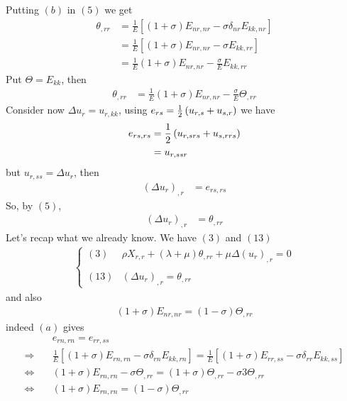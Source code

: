 Putting $(b)$ in $(5)$ we get
\begin{align}
\theta_{,rr}&= \frac{1}{E}\left[\left(1+\sigma\right)E_{nr,nr}-\sigma\delta_{nr}E_{kk,nr}\right]\\
&= \frac{1}{E}\left[\left(1+\sigma\right)E_{nr,nr}-\sigma E_{kk,rr}\right]\\
&= \frac{1}{E}\left(1+\sigma\right)E_{nr,nr}- \frac{\sigma}{E} E_{kk,rr}
\end{align}
Put $\Theta=E_{kk}$, then 
\begin{align}
\theta_{,rr}&= \frac{1}{E}\left(1+\sigma\right)E_{nr,nr}- \frac{\sigma}{E} \Theta_{,rr}
\end{align}
Consider now $\Delta u_r = u_{r,kk}$, using $e_{rs}=\frac{1}{2}\left(u_{r,s}+u_{s,r} \right)$ we have 
\begin{align}
e_{rs,rs}&= \frac{1}{2}\left(u_{r,srs}+u_{s,rrs} \right)\\
&=u_{r,ssr}
\end{align}
but $ u_{r,ss}=\Delta u_r$, then
\begin{align}
\left(\Delta u_r\right)_{,r}&= e_{rs,rs} 
\end{align} 
So, by $(5)$,
\begin{align}
\left(\Delta u_r\right)_{,r}&=\theta_{,rr}
\end{align}
Let's recap what we already know.
We have $(3)$ and $(13)$ 
\begin{align}
\left\{\begin{array}{ll}
(3)&\rho X_{r,r} +\left(\lambda+\mu\right)\theta_{,rr}+\mu\Delta \left(u_r\right)_{,r}=0\\\\
(13)&\left(\Delta u_r\right)_{,r}=\theta_{,rr}
\end{array}\right.
\end{align}
and also 
\begin{align}
\left(1+\sigma\right)E_{nr,nr} = \left(1-\sigma\right)\Theta_{,rr}
\end{align}
indeed $(a)$ gives
\begin{align}
&e_{rn,rn} = e_{rr,ss}\\
\Rightarrow \quad & \frac{1}{E}\left[\left(1+\sigma\right)E_{rn,rn}-\sigma \delta_{rn}E_{kk,rn}\right]= \frac{1}{E}\left[\left(1+\sigma\right)E_{rr,ss}-\sigma \delta_{rr}E_{kk,ss}\right]\\
\Leftrightarrow\quad & \left(1+\sigma\right)E_{rn,rn}-\sigma \Theta_{,rr}= \left(1+\sigma\right)\Theta_{,rr}-\sigma 3\Theta_{,rr}\\
\Leftrightarrow\quad & \left(1+\sigma\right)E_{rn,rn}= \left(1-\sigma\right)\Theta_{,rr}
\end{align}
